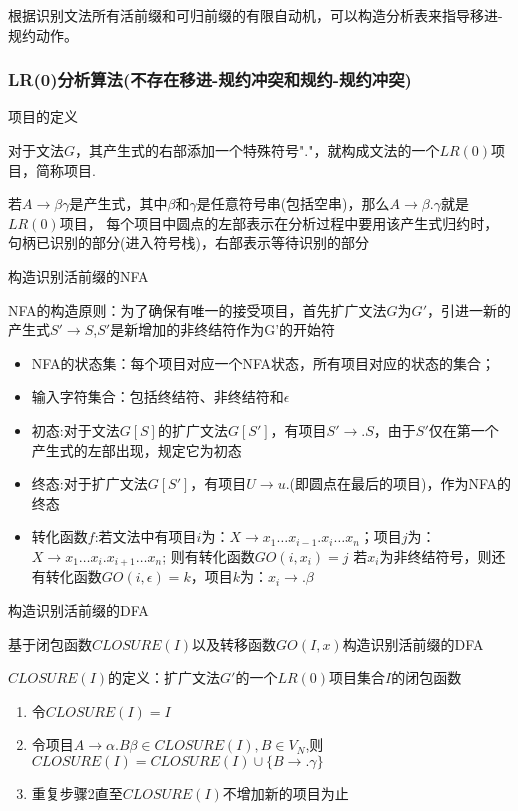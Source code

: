 \documentclass[utf8]{ctexart}
\begin{document}
根据识别文法所有活前缀和可归前缀的有限自动机，可以构造分析表来指导移进-规约动作。

\subsubsection{LR(0)分析算法(不存在移进-规约冲突和规约-规约冲突)}

\noindent 项目的定义

对于文法$G$，其产生式的右部添加一个特殊符号"."，就构成文法的一个$LR(0)$项目，简称项目.

若$A \rightarrow \beta \gamma$是产生式，其中$\beta$和$\gamma$是任意符号串(包括空串)，那么$A \rightarrow \beta . \gamma$就是$LR(0)$项目，
每个项目中圆点的左部表示在分析过程中要用该产生式归约时，句柄已识别的部分(进入符号栈)，右部表示等待识别的部分

\noindent 构造识别活前缀的NFA

NFA的构造原则：为了确保有唯一的接受项目，首先扩广文法$G$为$G'$，引进一新的产生式$S' \rightarrow S$,$S'$是新增加的非终结符作为G'的开始符
\begin{itemize}
    \item NFA的状态集：每个项目对应一个NFA状态，所有项目对应的状态的集合；
    \item 输入字符集合：包括终结符、非终结符和$\epsilon$
    \item 初态:对于文法$G[S]$的扩广文法$G[S']$，有项目$S' \rightarrow .S$，由于$S'$仅在第一个产生式的左部出现，规定它为初态
    \item 终态:对于扩广文法$G[S']$，有项目$U \rightarrow u.$(即圆点在最后的项目)，作为NFA的终态
    \item 转化函数$f$:若文法中有项目$i$为：$X \rightarrow x_1 \dots x_{i-1}.x_i \dots x_n$；项目$j$为：$X \rightarrow x_1\dots x_i .x_{i+1} \dots x_n$;
    则有转化函数$GO(i,x_i)=j$
    若$x_i$为非终结符号，则还有转化函数$GO(i,\epsilon)=k$，项目$k$为：$x_i→.\beta$
\end{itemize}

\noindent 构造识别活前缀的DFA

基于闭包函数$CLOSURE(I)$以及转移函数$GO(I,x)$构造识别活前缀的DFA

$CLOSURE(I)$的定义：扩广文法$G'$的一个$LR(0)$项目集合$I$的闭包函数
\begin{enumerate}
    \item 令$CLOSURE(I)=I$
    \item 令项目${A \rightarrow \alpha .B \beta} \in CLOSURE(I), {B \in V_N}$,则$CLOSURE(I)=CLOSURE(I)\cup \{B \rightarrow.\gamma\}$
    \item 重复步骤2直至$CLOSURE(I)$不增加新的项目为止
\end{enumerate}
\end{document}
